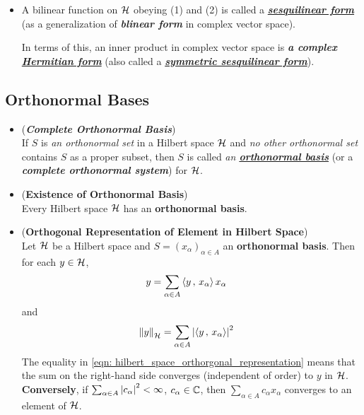 \documentclass[11pt]{article}
\begin{document}
\begin{itemize}
\item \begin{remark}
A bilinear function on ${\mathcal H}$ obeying (1) and (2) is called a \underline{\emph{\textbf{sesquilinear form}}} (as a generalization of \emph{\textbf{blinear form}} in complex vector space). 

In terms of this, an inner product in complex vector space is \emph{\textbf{a complex \underline{Hermitian form}}} (also called a \underline{\emph{\textbf{symmetric sesquilinear form}}}).
\end{remark}
\end{itemize}

\subsection{Orthonormal Bases}
\begin{itemize}
\item \begin{definition} (\emph{\textbf{Complete Orthonormal Basis}})\\
If $S$ is \emph{an orthonormal set} in a Hilbert space ${\mathcal H}$ and \emph{no other orthonormal set} contains $S$ as a proper subset, then $S$ is called \emph{an \underline{\textbf{orthonormal basis}}} (or a \emph{\textbf{complete orthonormal system}}) for ${\mathcal H}$.
\end{definition}

\item \begin{theorem} (\textbf{Existence of Orthonormal Basis})\\
Every Hilbert space ${\mathcal H}$ has an \textbf{orthonormal basis}.
\end{theorem}

\item \begin{proposition} (\textbf{Orthogonal Representation of Element in Hilbert Space})\\
Let ${\mathcal H}$ be a Hilbert space and $S = (x_{\alpha})_{\alpha \in A}$ an \textbf{orthonormal basis}. Then for each $y \in {\mathcal H}$,
\begin{align}
y &= \sum_{\alpha \in A}\left\langle y\,,\, x_{\alpha} \right\rangle x_{\alpha} \label{eqn: hilbert_space_orthorgonal_representation}
\end{align}
and
\begin{align}
\left\|y\right\|_{{\mathcal H}} &= \sum_{\alpha \in A}\left\lvert \left\langle y\,,\, x_{\alpha} \right\rangle \right\rvert^2 \label{eqn: hilbert_space_norm_representation}
\end{align}
The equality in \eqref{eqn: hilbert_space_orthorgonal_representation} means that the sum on the right-hand side converges (independent of order) to $y$ in ${\mathcal H}$. \textbf{Conversely}, if $\sum_{\alpha \in A}\left\lvert c_{\alpha} \right\rvert^2 < \infty$,  $c_{\alpha} \in {\mathbb C}$, then
$\sum_{\alpha \in A}c_{\alpha} x_{\alpha}$ converges to an element of ${\mathcal H}$.
\end{proposition}


\end{itemize}
\end{document}
